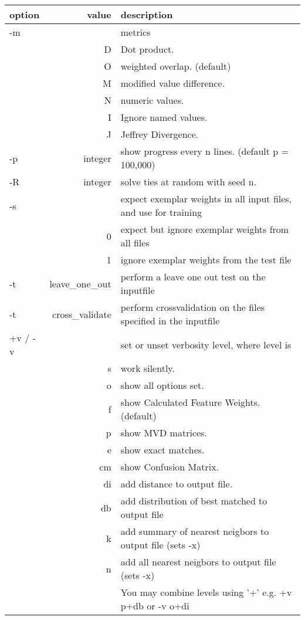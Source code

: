 \newpage

\begin{tabular}{|l|r|l|}
\hline
option & value & description \\
\hline
-m &   &  metrics \\
   & D & Dot product. \\
   & O & weighted overlap. (default) \\
   & M & modified value difference. \\
   & N & numeric values. \\ 
   & I & Ignore named  values. \\
   & J & Jeffrey Divergence. \\
-p & integer & show progress every n lines. (default p = 100,000) \\
-R & integer & solve ties at random with seed n. \\
-s &  & expect exemplar weights in all input files, and use for training \\
   & 0 & expect but ignore exemplar weights from all files \\
   & 1 & ignore exemplar weights from the test file \\
-t &  leave\_one\_out & perform a leave one out test on the inputfile \\
-t &  cross\_validate & perform crossvalidation on the files specified
   in the inputfile \\
+v / -v &    & set or unset verbosity level, where level is \\
   & s  & work silently. \\
   & o  & show all options set. \\
   & f  & show Calculated Feature Weights. (default) \\
   & p  & show MVD matrices. \\
   & e  & show exact matches. \\
   & cm & show Confusion Matrix. \\
   & di & add distance to output file. \\
   & db & add distribution of best matched to output file \\
   & k  & add summary of nearest neigbors to output file   (sets -x) \\
   & n  & add all nearest neigbors to output file   (sets -x) \\
   &    &  You may combine levels using '+' e.g. +v p+db or -v o+di \\

\end{tabular}
